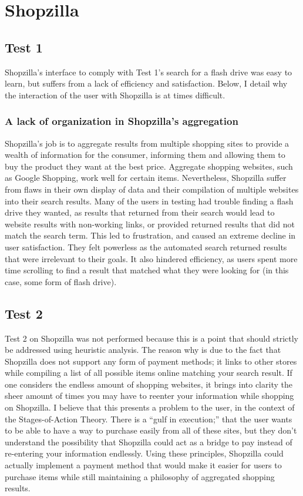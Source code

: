 \documentclass[11pt, oneside]{article}   	%
\begin{document}
\section{Shopzilla}
\subsection{Test 1}
Shopzilla's interface to comply with Test 1's search for a flash drive was easy to learn, but suffers from a lack of efficiency and satisfaction. Below, I detail why the interaction of the user with Shopzilla is at times difficult.
\subsubsection{A lack of organization in Shopzilla's aggregation}
Shopzilla's job is to aggregate results from multiple shopping sites to provide a wealth of information for the consumer, informing them and allowing them to buy the product they want at the best price. Aggregate shopping websites, such as Google Shopping, work well for certain items. Nevertheless, Shopzilla suffer from flaws in their own display of data and their compilation of multiple websites into their search results. Many of the users in testing had trouble finding a flash drive they wanted, as results that returned from their search would lead to website results with non-working links, or provided returned results that did not match the search term. This led to frustration, and caused an extreme decline in user satisfaction. They felt powerless as the automated search returned results that were irrelevant to their goals. It also hindered efficiency, as users spent more time scrolling to find a result that matched what they were looking for (in this case, some form of flash drive).
\subsection{Test 2}
Test 2 on Shopzilla was not performed because this is a point that should strictly be addressed using heuristic analysis. The reason why is due to the fact that Shopzilla does not support any form of payment methods; it links to other stores while compiling a list of all possible items online matching your search result. If one considers the endless amount of shopping websites, it brings into clarity the sheer amount of times you may have to reenter your information while shopping on Shopzilla. I believe that this presents a problem to the user, in the context of the Stages-of-Action Theory. There is a ``gulf in execution;'' that the user wants to be able to have a way to purchase easily from all of these sites, but they don't understand the possibility that Shopzilla could act as a bridge to pay instead of re-entering your information endlessly. Using these principles, Shopzilla could actually implement a payment method that would make it easier for users to purchase items while still maintaining a philosophy of aggregated shopping results. 
\end{document}
